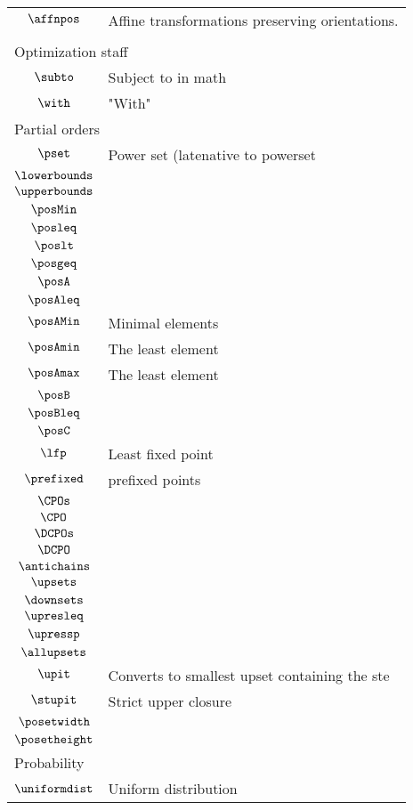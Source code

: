 \begin{longtable}{cl}
 $\affnpos$ &  Affine transformations preserving orientations.\\ 
 \multicolumn{2}{l}{}\\ 
 \hline
\hline
\multicolumn{2}{l}{Optimization staff}\\ 
 \hline
$\subto$ &  Subject to in math\\ 
 $\with$ &  "With"\\ 
 \multicolumn{2}{l}{Partial orders}\\ 
 \hline
$\pset$ &  Power set (latenative to powerset\\ 
 $\lowerbounds$ & \\ 
 $\upperbounds$ & \\ 
 $\posMin$ & \\ 
 $\posleq$ & \\ 
 $\poslt$ & \\ 
 $\posgeq$ & \\ 
 $\posA$ & \\ 
 $\posAleq$ & \\ 
 $\posAMin$ &   Minimal elements\\ 
 $\posAmin$ &   The least element\\ 
 $\posAmax$ &   The least element\\ 
 $\posB$ &  \\ 
 $\posBleq$ & \\ 
 $\posC$ &  \\ 
 $\lfp$ &  Least fixed point \\ 
 $\prefixed$ &  prefixed points \\ 
 $\CPOs$ & \\ 
 $\CPO$ & \\ 
 $\DCPOs$ & \\ 
 $\DCPO$ & \\ 
 $\antichains$ &  \\ 
 $\upsets$ & \\ 
 $\downsets$ & \\ 
 $\upresleq$ & \\ 
 $\upressp$ & \\ 
 $\allupsets$ &  \\ 
 $\upit$ &  Converts to smallest upset containing the ste\\ 
 $\stupit$ &  Strict upper closure\\ 
 $\posetwidth$ & \\ 
 $\posetheight$ & \\ 
 \multicolumn{2}{l}{Probability}\\ 
 \hline
$\uniformdist$ &  Uniform distribution\\ 

\end{longtable}
